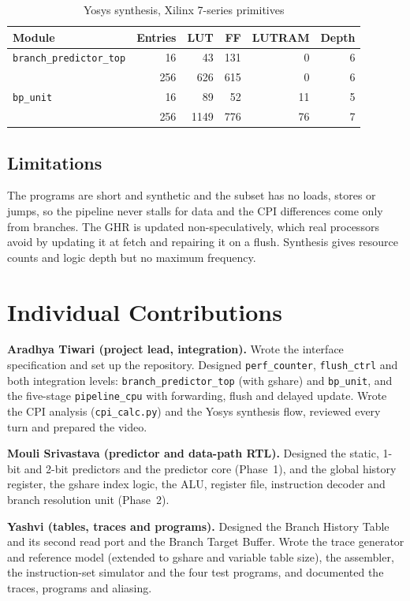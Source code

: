 \documentclass[conference]{IEEEtran}
\begin{document}
\begin{table}[!t]
\caption{Yosys synthesis, Xilinx 7-series primitives}
\label{tab:synth}
\centering
\footnotesize
\setlength{\tabcolsep}{4pt}
\begin{tabular}{@{}lrrrrr@{}}
\toprule
Module & Entries & LUT & FF & LUTRAM & Depth \\
\midrule
\texttt{branch\_predictor\_top} & 16  &   43 & 131 &  0 & 6 \\
                                & 256 &  626 & 615 &  0 & 6 \\
\texttt{bp\_unit}               & 16  &   89 &  52 & 11 & 5 \\
                                & 256 & 1149 & 776 & 76 & 7 \\
\bottomrule
\end{tabular}
\end{table}

\subsection{Limitations}
The programs are short and synthetic and the subset has no loads, stores or jumps, so the
pipeline never stalls for data and the CPI differences come only from branches. The GHR is
updated non-speculatively, which real processors avoid by updating it at fetch and repairing it
on a flush. Synthesis gives resource counts and logic depth but no maximum frequency.

\section{Individual Contributions}
\textbf{Aradhya Tiwari (project lead, integration).} Wrote the interface specification and set up
the repository. Designed \texttt{perf\_counter}, \texttt{flush\_ctrl} and both integration levels:
\texttt{branch\_predictor\_top} (with gshare) and \texttt{bp\_unit}, and the five-stage
\texttt{pipeline\_cpu} with forwarding, flush and delayed update. Wrote the CPI analysis
(\texttt{cpi\_calc.py}) and the Yosys synthesis flow, reviewed every turn and prepared the video.

\textbf{Mouli Srivastava (predictor and data-path RTL).} Designed the static, 1-bit and 2-bit
predictors and the predictor core (Phase~1), and the global history register, the gshare index
logic, the ALU, register file, instruction decoder and branch resolution unit (Phase~2).

\textbf{Yashvi (tables, traces and programs).} Designed the Branch History Table and its second
read port and the Branch Target Buffer. Wrote the trace generator and reference model (extended
to gshare and variable table size), the assembler, the instruction-set simulator and the four
test programs, and documented the traces, programs and aliasing.
\end{document}
